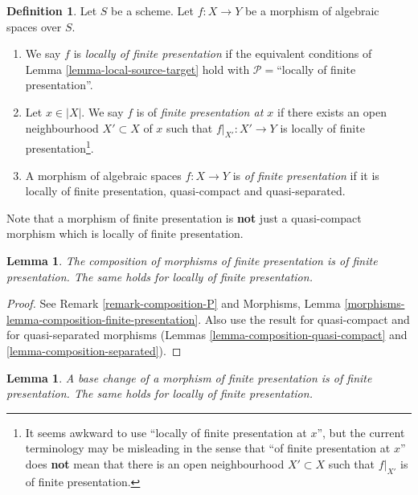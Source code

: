 \documentclass{stacks-project}
\theoremstyle{plain}
\newtheorem{lemma}[subsection]{Lemma}
\theoremstyle{definition}
\newtheorem{definition}[subsection]{Definition}
\theoremstyle{remark}
\numberwithin{equation}{subsection}
\begin{document}
\begin{definition}
\label{definition-locally-finite-presentation}
Let $S$ be a scheme.
Let $f : X \to Y$ be a morphism of algebraic spaces over $S$.
\begin{enumerate}
\item We say $f$ is {\it locally of finite presentation} if
the equivalent conditions of
Lemma \ref{lemma-local-source-target}
hold with $\mathcal{P} =$``locally of finite presentation''.
\item Let $x \in |X|$. We say $f$ is of {\it finite presentation at $x$}
if there exists an open neighbourhood $X' \subset X$ of $x$ such
that $f|_{X'} : X' \to Y$ is locally of finite
presentation\footnote{It seems awkward to use ``locally of finite presentation
at $x$'', but the current terminology may be misleading in the sense that
``of finite presentation at $x$'' does {\bf not} mean that there is
an open neighbourhood $X' \subset X$ such that $f|_{X'}$ is of finite
presentation.}.
\item A morphism of algebraic spaces $f : X \to Y$ is
{\it of finite presentation}
if it is locally of finite presentation, quasi-compact and
quasi-separated.
\end{enumerate}
\end{definition}

\noindent
Note that a morphism of finite presentation is {\bf not} just a quasi-compact
morphism which is locally of finite presentation.

\begin{lemma}
\label{lemma-composition-finite-presentation}
The composition of morphisms of finite presentation is of finite presentation.
The same holds for locally of finite presentation.
\end{lemma}

\begin{proof}
See Remark \ref{remark-composition-P} and
Morphisms, Lemma \ref{morphisms-lemma-composition-finite-presentation}.
Also use the result for quasi-compact and for quasi-separated morphisms
(Lemmas \ref{lemma-composition-quasi-compact} and
\ref{lemma-composition-separated}).
\end{proof}

\begin{lemma}
\label{lemma-base-change-finite-presentation}
A base change of a morphism of finite presentation is of finite presentation.
The same holds for locally of finite presentation.
\end{lemma}
\end{document}
